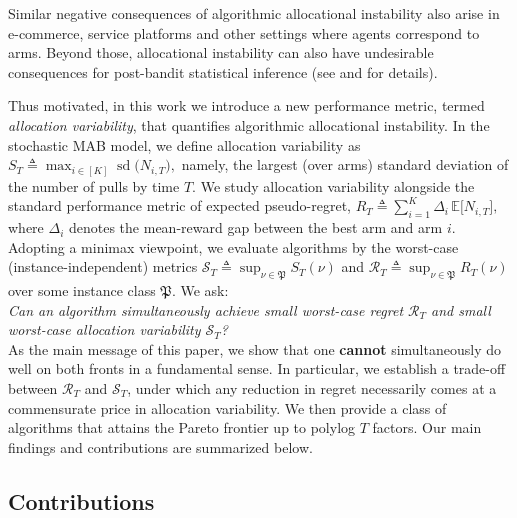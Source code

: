 \documentclass[nonblindrev]{informs3_noinforms}
\newcommand{\E}{{\mathbb{E}}}
\DeclareMathOperator{\sd}{sd}
\begin{document}
\indent\indent Similar negative consequences of algorithmic allocational instability also arise in e-commerce, service platforms and other settings where agents correspond to arms. Beyond those, allocational instability can also have undesirable consequences for post-bandit statistical inference (see  and  for details). 


    Thus motivated, in this work we introduce a new performance metric, termed \emph{allocation variability}, that quantifies algorithmic allocational instability. In the stochastic MAB model, we define allocation variability as $S_T\triangleq \max_{i\in[K]} \sd\!\big(N_{i,T}\big),$ namely, the largest (over arms) standard deviation of the number of pulls by time $T$. We study allocation variability alongside the standard performance metric of expected pseudo-regret, $R_T\triangleq\sum_{i=1}^K \Delta_i\,\E\big[N_{i,T}\big],$ where $\Delta_i$ denotes the mean-reward gap between the best arm and arm $i$. Adopting a minimax viewpoint, we evaluate algorithms by the worst-case (instance-independent) metrics $\mathcal{S}_T \triangleq\sup_{\nu\in\mathfrak{P}} S_T(\nu)$ and $\mathcal{R}_T \triangleq \sup_{\nu\in\mathfrak{P}} R_T(\nu)$ over some instance class $\mathfrak{P}.$ {We ask:}\\

\emph{Can an algorithm simultaneously achieve small worst-case regret $\mathcal{R}_T$ and small worst-case allocation variability $\mathcal{S}_T$?}\\

As the main message of this paper, we show that one \textbf{cannot} simultaneously do well on both fronts in a fundamental sense. In particular, we establish a trade-off between $\mathcal{R}_T$ and $\mathcal{S}_T$, under which any reduction in regret necessarily comes at a commensurate price in allocation variability. We then provide a class of algorithms that attains the Pareto frontier up to polylog $T$ factors. Our main findings and contributions are summarized below.
      
    
\subsection{Contributions}
\end{document}

